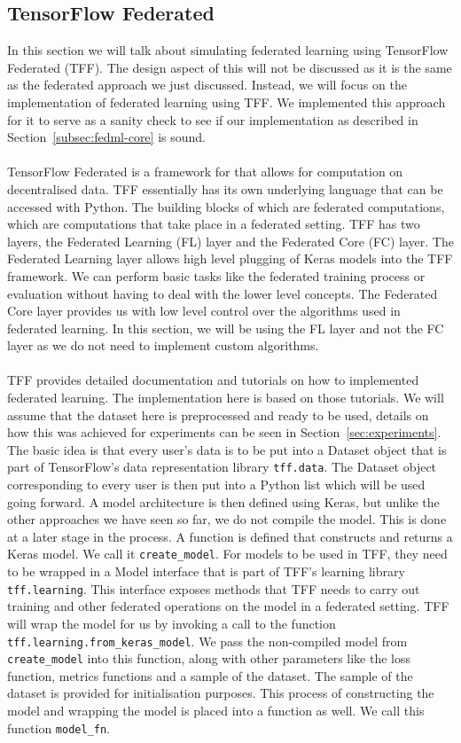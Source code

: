 \documentclass[12pt]{article}
\begin{document}
\subsection{TensorFlow Federated}\label{subsec:tff}
In this section we will talk about simulating federated learning using TensorFlow Federated (TFF). The design aspect of this will not be discussed as it is the same as the federated approach we just discussed. Instead, we will focus on the implementation of federated learning using TFF. We implemented this approach for it to serve as a sanity check to see if our implementation as described in Section~\ref{subsec:fedml-core} is sound. 
\\\\
TensorFlow Federated is a framework for that allows for computation on decentralised data. TFF essentially has its own underlying language that can be accessed with Python. The building blocks of which are federated computations, which are computations that take place in a federated setting. TFF has two layers, the Federated Learning (FL) layer and the Federated Core (FC) layer. The Federated Learning layer allows high level plugging of Keras models into the TFF framework. We can perform basic tasks like the federated training process or evaluation without having to deal with the lower level concepts. The Federated Core layer provides us with low level control over the algorithms used in federated learning. In this section, we will be using the FL layer and not the FC layer as we do not need to implement custom algorithms. 
\\\\
TFF provides detailed documentation and tutorials on how to implemented federated learning. The implementation here is based on those tutorials. We will assume that the dataset here is preprocessed and ready to be used, details on how this was achieved for experiments can be seen in Section~\ref{sec:experiments}. The basic idea is that every user's data is to be put into a Dataset object that is part of TensorFlow's data representation library \texttt{tff.data}. The Dataset object corresponding to every user is then put into a Python list which will be used going forward. A model architecture is then defined using Keras, but unlike the other approaches we have seen so far, we do not compile the model. This is done at a later stage in the process. A function is defined that constructs and returns a Keras model. We call it \texttt{create\_model}. For models to be used in TFF, they need to be wrapped in a Model interface that is part of TFF's learning library \texttt{tff.learning}. This interface exposes methods that TFF needs to carry out training and other federated operations on the model in a federated setting. TFF will wrap the model for us by invoking a call to the function \texttt{tff.learning.from\_keras\_model}. We pass the non-compiled model from \texttt{create\_model} into this function, along with other parameters like the loss function, metrics functions and a sample of the dataset. The sample of the dataset is provided for initialisation purposes. This process of constructing the model and wrapping the model is placed into a function as well. We call this function \texttt{model\_fn}.
\end{document}

